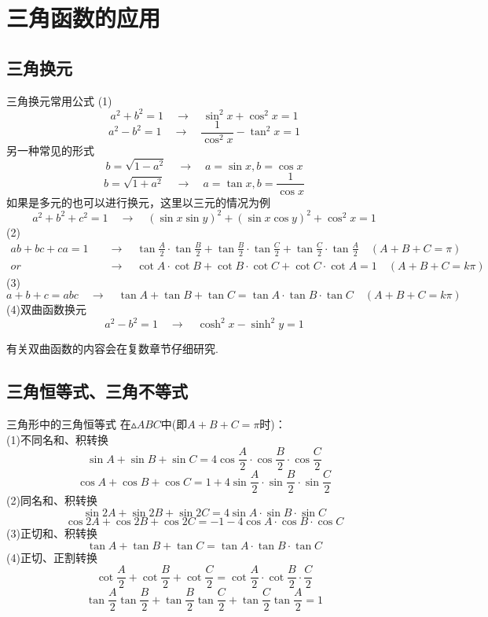 \documentclass[lang=cn, zihao=5]{elegantbook}
\begin{document}
\section{三角函数的应用}

\subsection{三角换元}

\begin{proposition}{三角换元常用公式}
    (1)
    $$a^2+b^2=1 \quad \longrightarrow \quad \sin^2{x}+\cos^2{x}=1$$
    $$a^2-b^2=1 \quad \longrightarrow \quad \frac{1}{\cos^2 x}-\tan^2 {x}=1$$
    另一种常见的形式
    $$b=\sqrt{1-a^2} \quad \longrightarrow \quad a=\sin{x} , b=\cos{x}$$
    $$b=\sqrt{1+a^2} \quad \longrightarrow \quad a=\tan{x} , b=\frac{1}{\cos{x}}$$
    如果是多元的也可以进行换元，这里以三元的情况为例
    $$a^2+b^2+c^2=1 \quad \longrightarrow \quad (\sin{x}\sin{y})^2+(\sin{x}\cos{y})^2+\cos^2{x}=1$$
    (2)
    \begin{align*}
        ab+bc+ca=1 \quad & \longrightarrow \quad \tan{\frac{A}{2}} \cdot \tan{\frac{B}{2}} + \tan{\frac{B}{2}} \cdot \tan{\frac{C}{2}} + \tan{\frac{C}{2}} \cdot \tan{\frac{A}{2}} \quad (A+B+C=\pi) \\
        or & \longrightarrow \quad \cot{A} \cdot \cot{B} + \cot{B} \cdot \cot{C} + \cot{C} \cdot \cot{A} = 1 \quad (A+B+C=k\pi)
    \end{align*}
    (3)$$a+b+c=abc \quad \longrightarrow \quad \tan{A}+\tan{B}+\tan{C}=\tan{A} \cdot \tan{B} \cdot \tan{C} \quad (A+B+C=k\pi)$$
    (4)双曲函数换元
    $$a^2-b^2=1 \quad \longrightarrow \quad \cosh^2{x}-\sinh^2{y}=1$$
\end{proposition}
\begin{remark}
	有关双曲函数的内容会在复数章节仔细研究.
\end{remark}

\subsection{三角恒等式、三角不等式}

\begin{proposition}{三角形中的三角恒等式} %
    在$\vartriangle ABC$中(即$A+B+C=\pi$时)：\\
    (1)不同名和、积转换
    $$\sin A + \sin B + \sin C = 4 \cos \frac{A}{2} \cdot \cos \frac{B}{2} \cdot \cos \frac{C}{2}$$
    $$\cos A + \cos B + \cos C = 1 + 4 \sin \frac{A}{2} \cdot \sin \frac{B}{2} \cdot \sin \frac{C}{2}$$
    (2)同名和、积转换
    $$\sin 2A + \sin 2B + \sin 2C = 4\sin A \cdot \sin B \cdot \sin C$$
    $$\cos 2A + \cos 2B + \cos 2C = -1 - 4\cos A \cdot \cos B \cdot \cos C$$
    (3)正切和、积转换
    $$\tan A + \tan B + \tan C = \tan A \cdot \tan B \cdot \tan C$$
    (4)正切、正割转换
    $$\cot \frac{A}{2} + \cot \frac{B}{2} + \cot \frac{C}{2} = \cot \frac{A}{2} \cdot \cot \frac{B}{2} \cdot \frac{C}{2}$$
    $$\tan \frac{A}{2} \tan \frac{B}{2} + \tan \frac{B}{2} \tan \frac{C}{2} + \tan \frac{C}{2} \tan \frac{A}{2} = 1$$
\end{proposition}
\end{document}
